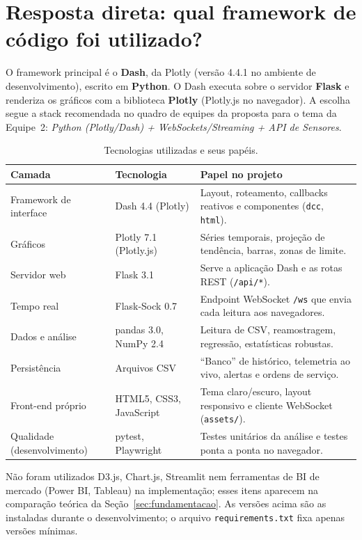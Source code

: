 \documentclass[12pt,a4paper]{article}
\newcommand{\codigo}[1]{\texttt{\small #1}}
\begin{document}
\section{Resposta direta: qual framework de código foi utilizado?}
\label{sec:framework}
O framework principal é o \textbf{Dash}, da Plotly (versão 4.4.1 no ambiente de desenvolvimento), escrito em \textbf{Python}. O Dash executa
sobre o servidor \textbf{Flask} e renderiza os gráficos com a biblioteca \textbf{Plotly} (Plotly.js no navegador). A escolha segue a stack
recomendada no quadro de equipes da proposta para o tema da Equipe~2: \emph{Python (Plotly/Dash) + WebSockets/Streaming + API de Sensores}.

\begin{table}[H]
\centering
\caption{Tecnologias utilizadas e seus papéis.}
\label{tab:stack}
\begin{tabularx}{\textwidth}{@{}l l X@{}}
\toprule
\textbf{Camada} & \textbf{Tecnologia} & \textbf{Papel no projeto}\\
\midrule
Framework de interface & Dash 4.4 (Plotly) & Layout, roteamento, callbacks reativos e componentes (\codigo{dcc}, \codigo{html}).\\
Gráficos & Plotly 7.1 (Plotly.js) & Séries temporais, projeção de tendência, barras, zonas de limite.\\
Servidor web & Flask 3.1 & Serve a aplicação Dash e as rotas REST (\codigo{/api/*}).\\
Tempo real & Flask-Sock 0.7 & Endpoint WebSocket \codigo{/ws} que envia cada leitura aos navegadores.\\
Dados e análise & pandas 3.0, NumPy 2.4 & Leitura de CSV, reamostragem, regressão, estatísticas robustas.\\
Persistência & Arquivos CSV & ``Banco'' de histórico, telemetria ao vivo, alertas e ordens de serviço.\\
Front-end próprio & HTML5, CSS3, JavaScript & Tema claro/escuro, layout responsivo e cliente WebSocket (\codigo{assets/}).\\
Qualidade (desenvolvimento) & pytest, Playwright & Testes unitários da análise e testes ponta a ponta no navegador.\\
\bottomrule
\end{tabularx}
\end{table}

Não foram utilizados D3.js, Chart.js, Streamlit nem ferramentas de BI de mercado (Power BI, Tableau) na implementação; esses itens aparecem
na comparação teórica da Seção~\ref{sec:fundamentacao}. As versões acima são as instaladas durante o desenvolvimento; o arquivo
\codigo{requirements.txt} fixa apenas versões mínimas.
\end{document}
